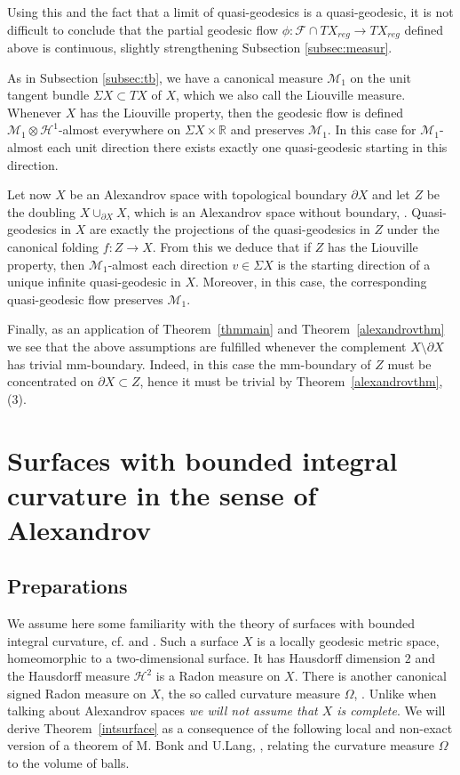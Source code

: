 \documentclass[12pt,leqno]{amsart}
\numberwithin{equation}{section}
\theoremstyle{definition}
\theoremstyle{remark}
\newcommand{\tref}[1]{Theorem~\ref{#1}}
\newcommand{\R}{\mathbb{R}}
\begin{document}
Using this and the fact that a limit of quasi-geodesics is a quasi-geodesic, it is not difficult to conclude that the partial geodesic flow $\phi:\mathcal F\cap TX_{reg} \to TX_{reg}$ defined above is continuous, slightly strengthening Subsection \ref{subsec:measur}.


As in Subsection \ref{subsec:tb}, we have a canonical measure $\mathcal M _1$   on the unit tangent bundle $\Sigma X \subset TX $ of $X$, which we also call the Liouville measure. Whenever
$X$ has the Liouville property, then the geodesic flow is defined $\mathcal M_1\otimes \mathcal H^1$-almost everywhere on $\Sigma X \times \R$ and preserves $\mathcal M_1$.  In this case    for $\mathcal M_1$-almost each unit direction there exists exactly one quasi-geodesic starting in this direction.

Let now $X$ be an  Alexandrov space with topological boundary $\partial X$ and let $Z$ be the doubling $X\cup _{\partial X} X$, which
is an Alexandrov space without boundary, \cite{P2}. Quasi-geodesics in $X$ are exactly the projections of the quasi-geodesics in $Z$ under
the canonical folding $f:Z\to X$.   From this we deduce that if $Z$ has the Liouville property, then $\mathcal M_1$-almost each  direction $v\in \Sigma X$ is the starting direction of a unique infinite quasi-geodesic in $X$. Moreover, in this case,  the corresponding quasi-geodesic flow preserves $\mathcal M_1$.

Finally, as an application of \tref{thmmain} and \tref{alexandrovthm} we see that the above assumptions are fulfilled whenever the complement $X\setminus\partial X$ has trivial mm-boundary. Indeed, in this case the mm-boundary of $Z$ must be concentrated on $\partial X \subset Z$, hence it must be trivial by \tref{alexandrovthm},(3).



\section{Surfaces with bounded integral curvature in the sense of Alexandrov} \label{sec:surface}
\subsection{Preparations} We assume here some  familiarity  with the theory of surfaces with bounded integral curvature, cf. \cite{AZ} and
 \cite{Reshetnyak-GeomIV}.  Such a surface $X$ is a locally geodesic metric space, homeomorphic to a two-dimensional surface.  It has Hausdorff dimension $2$  and  the Hausdorff measure $\mathcal H^2$ is a Radon measure  on $X$.   There is another canonical signed Radon measure on $X$, the so called curvature measure $\Omega$, \cite[Section 8]{Reshetnyak-GeomIV}. Unlike when talking about Alexandrov spaces \emph{we will not assume that $X$ is complete}.
 We will derive  \tref{intsurface} as a consequence of the following local and non-exact version of a theorem of M. Bonk and U.Lang, \cite{Bonk-Lang}, relating the curvature measure $\Omega$ to the volume of balls.
\end{document}
